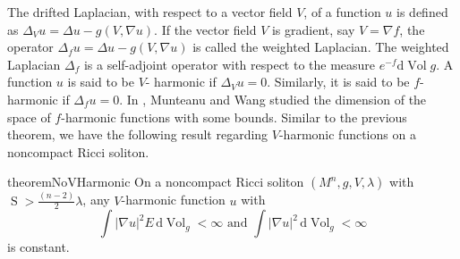 \documentclass{amsart}
\newcommand{\abs}[1]{\left| #1 \right|}
\newcommand{\derivative}{\mathrm{d}}
\DeclareMathOperator*{\scalar}{S}
\DeclareMathOperator*{\Vol}{Vol}
\theoremstyle{plain}
\theoremstyle{plain}
\theoremstyle{plain}
\theoremstyle{plain}
\theoremstyle{remark}
\begin{document}
    The drifted Laplacian, with respect to a vector field $V$, of a function $u$ is defined as 
    $\Delta_{V} u =   \Delta u - g(V,\nabla u) $. 
    If the vector field $V$ is gradient, say $V=\nabla f$, the operator 
    $\Delta_f u = \Delta u - g(V, \nabla u)$ is called the weighted Laplacian. 
    The weighted Laplacian $\Delta_f$ is a self-adjoint operator with respect to the measure 
    $e^{-f} \derivative{\Vol} g$.
    A function $u$ is said to be $V$- harmonic if $\Delta_V u = 0$. Similarly, it is said to be $f$-harmonic if $\Delta_f u = 0$. 
    In \cite{MR2843238}, Munteanu and Wang studied the dimension of the space of $f$-harmonic functions with some bounds.
    Similar to the previous theorem, we have the following result regarding $V$-harmonic functions on a noncompact Ricci soliton.
    \begin{restatable}{theorem}{NoVHarmonic}
    	\label{thm: No V-harmonic function with constant energy and scalar bounded below}
        On a noncompact Ricci soliton $(M^n, g, V, \lambda)$ with $\scalar> \frac{(n-2)}{2} \lambda $,
    	any $V$-harmonic function $u$ with
        $$ \int \abs{\nabla u}^2 E \, \derivative {\Vol}_g <\infty \text{ and } 
             \int \abs{\nabla u}^2 \, \derivative {\Vol}_g <\infty $$
        is constant.
    \end{restatable}
\end{document}
